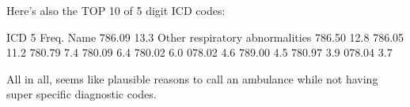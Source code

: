 \documentclass{article}
\begin{document}
\begin{enumerate}
\begin{markdown}
Here's also the TOP 10 of 5 digit ICD codes:

	ICD 5	Freq.	Name
	786.09	13.3	Other respiratory abnormalities
	786.50	12.8%
	786.05	11.2%
	780.79	7.4%
	780.09	6.4%
	780.02	6.0%
	078.02	4.6%
	789.00	4.5%
	780.97	3.9%
	078.04	3.7%

All in all, seems like plausible reasons to call an ambulance while not having super specific diagnostic codes.
\end{markdown}
\end{enumerate}
\end{document}
